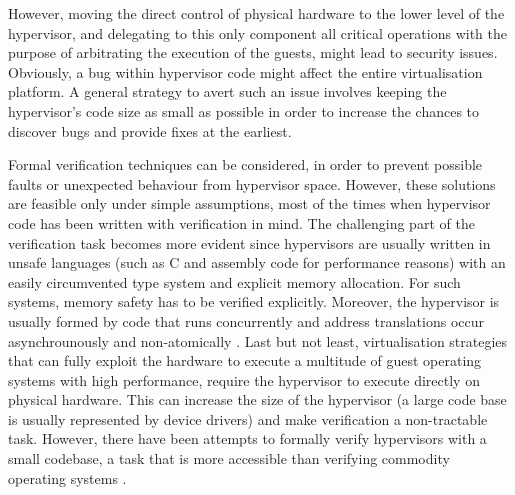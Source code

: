 However, moving the direct control of physical hardware to the lower level of the hypervisor, and delegating to this only component all critical operations with the purpose of arbitrating the execution of the guests, might lead to security issues. Obviously, a bug within hypervisor code might affect the entire virtualisation platform. 
A general strategy to avert such an issue involves keeping the hypervisor's code size as small as possible in order to increase the chances to discover bugs and provide fixes at the earliest.
 
Formal verification techniques can be considered, in order to prevent possible faults or unexpected behaviour from hypervisor space. However, these solutions are feasible only under simple assumptions, most of the times when hypervisor code has been written with verification in mind. 
The challenging part of the verification task becomes more evident since hypervisors are usually written in unsafe languages (such as C and assembly code for performance reasons) with an easily circumvented type system and explicit memory allocation. For such systems, memory safety has to be verified explicitly. Moreover, the hypervisor is usually formed by code that runs concurrently and address translations occur asynchrounously and non-atomically \cite{formalmethods,verifyhyperv}.  
Last but not least, virtualisation strategies that can fully exploit the hardware to execute a multitude of guest operating systems with high performance, require the hypervisor to execute directly on physical hardware. This can increase the size of the hypervisor (a large code base is usually represented by device drivers) and make verification a non-tractable task. However, there have been attempts to formally verify hypervisors with a small codebase, a task that is more accessible than verifying commodity operating systems \cite{verifyhyperv, formsecxenon}.   


